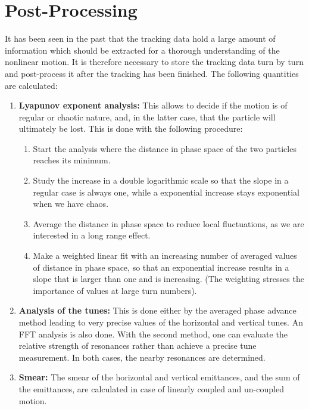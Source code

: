 \section{Post-Processing} \label{PosPro}

It has been seen in the past that the tracking data hold a large amount of information which should be extracted for a thorough understanding of the nonlinear motion.
It is therefore necessary to store the tracking data turn by turn and post-process it after the tracking has been finished.
The following quantities are calculated:

\begin{enumerate}
    \item \textbf{Lyapunov exponent analysis:} This allows to decide if the motion is of regular or chaotic nature, and, in the latter case, that the particle will ultimately be lost. This is done with the following procedure:
    \begin{enumerate}
        \item Start the analysis where the distance in phase space of the two particles reaches its minimum.
        \item Study the increase in a double logarithmic scale so that the slope in a regular case is always one, while a exponential increase stays exponential when we have chaos.
        \item Average the distance in phase space to reduce local fluctuations, as we are interested in a long range effect.
        \item Make a weighted linear fit with an increasing number of averaged values of distance in phase space, so that an exponential increase results in a slope that is larger than one and is increasing. (The weighting stresses the importance of values at large turn numbers).
    \end{enumerate}
    \item \textbf{Analysis of the tunes:} This is done either by the averaged phase advance method leading to very precise values of the horizontal and vertical tunes. An FFT analysis is also done. With the second method, one can evaluate the relative strength of resonances rather than achieve a precise tune measurement. In both cases, the nearby resonances are determined.
    \item \textbf{Smear:} The smear of the horizontal and vertical emittances, and the sum of the emittances, are calculated in case of linearly coupled and un-coupled motion.

\end{enumerate}
